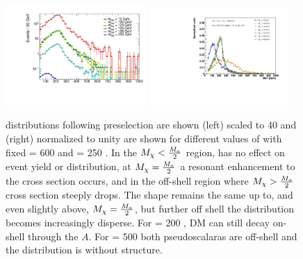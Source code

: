 \begin{figure}
\centering
\includegraphics[width=0.48\textwidth]{texinputs/04_grid/figures/monoz/leptonic/mDMScan_mA600_ma250_MET.pdf}
\includegraphics[width=0.47\textwidth]{texinputs/04_grid/figures/monoz/leptonic/mDMScan_ma250.pdf}
\caption{\MET distributions following preselection are shown (left) scaled to 40 \ifb and (right) normalized to unity are shown for different values of \mDM with fixed \mA = 600 \GeV and \ma = 250 \GeV.  In the $M_{\chi} < \frac{M_{a}}{2}$ region, \mDM has no effect on event yield or \MET distribution, at $M_{\chi} = \frac{M_{a}}{2}$ a resonant enhancement to the cross section occurs, and in the off-shell region where  $M_{\chi} > \frac{M_{a}}{2}$ cross section steeply drops.  The \MET shape remains the same up to, and even slightly above, $M_{\chi} = \frac{M_{a}}{2}$, but further off shell the \MET distribution becomes increasingly disperse.  For \mDM = 200 \GeV, DM can still decay on-shell through the $A$.  For \mDM = 500 \GeV both pseudoscalaras are off-shell and the \MET distribution is without structure.}
\label{fig:dm_scan_ll}
\end{figure}


